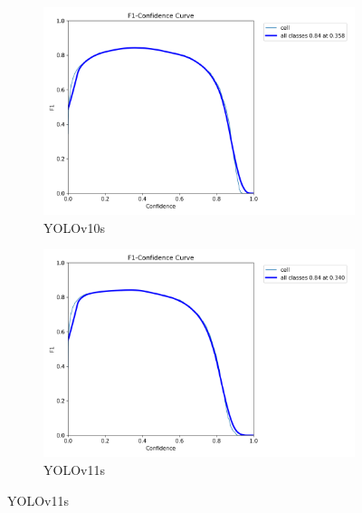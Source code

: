 \documentclass[12pt,a4paper,onecolumn,oneside]{report}
\begin{document}
\begin{figure}[H]
  \vspace{0.0cm}
  \begin{subfigure}[b]{0.48\textwidth}
    \centering
    \includegraphics[width=\textwidth]{figuras/resultados experimentacion/yolov10s/original_test/BoxF1_curve.png}
    \caption{YOLOv10s}
    \label{fig:yolov10s_original_test}
  \end{subfigure}
  \hfill
  \begin{subfigure}[b]{0.48\textwidth}
    \centering
    \includegraphics[width=\textwidth]{figuras/resultados experimentacion/yolov11s/original_test/BoxF1_curve.png}
    \caption{YOLOv11s}
    \label{fig:yolov11s_original_test}
  \end{subfigure}
  

\end{figure}
\end{document}
